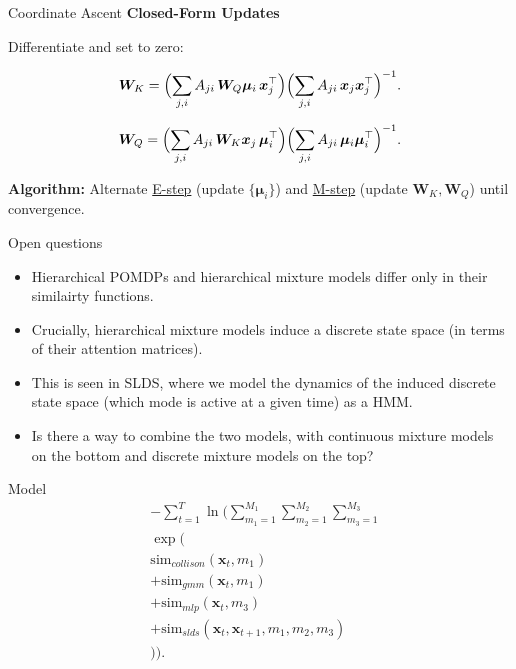 \documentclass{beamer}
\begin{document}
\begin{frame}{Coordinate Ascent}
    \large
    \textbf{Closed-Form Updates}
    
    Differentiate and set to zero:
    
    \[
    \bm{W}_K
    =
    \Bigl(\sum_{j,i}A_{ji}\,\bm{W}_Q\bm{\mu}_i\,\bm{x}_j^\top\Bigr)
    \Bigl(\sum_{j,i}A_{ji}\,\bm{x}_j\bm{x}_j^\top\Bigr)^{-1}.
    \]
    
    \[
    \bm{W}_Q
    =
    \Bigl(\sum_{j,i}A_{ji}\,\bm{W}_K\bm{x}_j\,\bm{\mu}_i^\top\Bigr)
    \Bigl(\sum_{j,i}A_{ji}\,\bm{\mu}_i\bm{\mu}_i^\top\Bigr)^{-1}.
    \]
    
    \bigskip
    
    \textbf{Algorithm:}  
    Alternate \underline{E-step} (update \(\{\bm{\mu}_i\}\)) and \underline{M-step} (update \(\bm{W}_K,\bm{W}_Q\)) until convergence.
    \end{frame}
    

\begin{frame}{Open questions}
    \begin{itemize}
        \item Hierarchical POMDPs and hierarchical mixture models differ only in their similairty functions.
        \item Crucially, hierarchical mixture models induce a discrete state space (in terms of their attention matrices). 
        \item This is seen in SLDS, where we model the dynamics of the induced discrete state space (which mode is active at a given time) as a HMM. 
        \item Is there a way to combine the two models, with continuous mixture models on the bottom and discrete mixture models on the top?
    \end{itemize}
\end{frame}


\begin{frame}{Model}
    \begin{equation}
    \begin{aligned}
        &-\sum_{t=1}^{T}
        \ln \Biggl(
        \sum_{m_1=1}^{M_1} \sum_{m_2=1}^{M_2} \sum_{m_3=1}^{M_3} \\
        &\exp\bigl( \\
        &\mathrm{sim}_{collison}(\bm{x}_t, m_1) \\
        &+\mathrm{sim}_{gmm}(\bm{x}_t, m_1) \\
        &+\mathrm{sim}_{mlp}(\bm{x}_t, m_3) \\
        &+\mathrm{sim}_{slds}(\bm{x}_{t}, \bm{x}_{t+1}, m_1, m_2, m_3) \\
        &\bigr) \Biggr).
    \end{aligned}
    \end{equation}
        
\end{frame}


%     
%     
\end{document}
